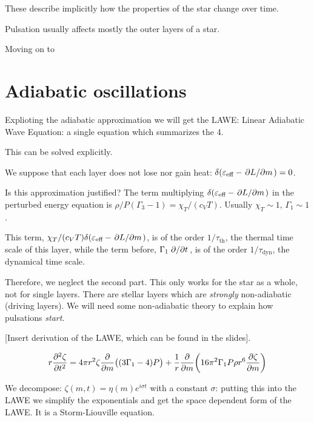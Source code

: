 \documentclass[main.tex]{subfiles}
\begin{document}
These describe implicitly how the properties of the star change over time.

Pulsation usually affects mostly the outer layers of a star.

Moving on to

\section{Adiabatic oscillations}

Explioting the adiabatic approximation we will get the LAWE: Linear Adiabatic Wave Equation: a single equation which summarizes the 4.

This can be solved explicitly.

We suppose that each layer does not lose nor gain heat: \(\delta (\varepsilon_{\text{eff}} - \pdv*{L}{m} )=0\).

Is this approximation justified? The term multiplying \(\delta (\varepsilon_{\text{eff}} - \pdv*{L}{m} )\) in the perturbed energy equation is \(\rho/P (\Gamma_3-1) = \chi_T / (c_V T)\).
Usually \(\chi_T \sim 1\), \(\Gamma_1 \sim 1\).

This term,  \( \chi_T / (c_V T) \delta (\varepsilon_{\text{eff}} - \pdv*{L}{m} )\), is of the order \(1/\tau_{\text{th}}\), the thermal time scale of this layer, while the term before, \(\Gamma_1 \pdv*{}{t} (\delta \rho / \rho)\), is of the order \(1/\tau_{\text{dyn}}\), the dynamical time scale.

Therefore, we neglect the second part.
This only works for the star as a whole, not for single layers.
There are stellar layers which are \emph{strongly} non-adiabatic (driving layers). We will need some non-adiabatic theory to explain how pulsations \emph{start}.

[Insert derivation of the LAWE, which can be found in the slides].

\begin{equation}
  r \pdv[2]{\zeta}{t} =
  4 \pi r^2 \zeta \pdv{}{m} \qty((3 \Gamma_1 - 4)P)+
  \frac{1}{r} \pdv{}{m} \qty(16 \pi^2 \Gamma_1 P \rho r^6 \pdv{\zeta}{m} )
\end{equation}

We decompose: \(\zeta(m, t) = \eta(m) e^{i \sigma t}\) with a constant \(\sigma\): putting this into the LAWE we simplify the exponentials and get the space dependent form of the LAWE.
It is a Storm-Liouville equation.
\end{document}
